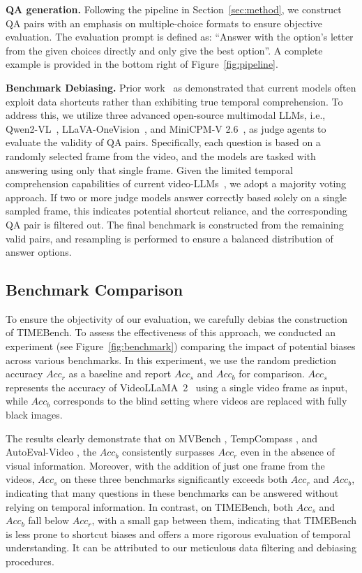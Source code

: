 \noindent\textbf{QA generation.} Following the pipeline in Section~\ref{sec:method}, we construct QA pairs with an emphasis on multiple-choice formats to ensure objective evaluation. The evaluation prompt is defined as: ``Answer with the option's letter from the given choices directly and only give the best option''. A complete example is provided in the bottom right of Figure~\ref{fig:pipeline}. 

\noindent\textbf{Benchmark Debiasing.} Prior work~\cite{Tong2024Eyes} as demonstrated that current models often exploit data shortcuts rather than exhibiting true temporal comprehension. To address this, we utilize three advanced open-source multimodal LLMs, i.e., Qwen2-VL~\cite{Wang2024Qwen2-VL}, LLaVA-OneVision~\cite{Li2025LLaVA-OneVision}, and MiniCPM-V 2.6~\cite{Yao2024MiniCPM-V}, as judge agents to evaluate the validity of QA pairs. 
Specifically, each question is based on a randomly selected frame from the video, and the models are tasked with answering using only that single frame. Given the limited temporal comprehension capabilities of current video-LLMs~\cite{Wang2024VideoHallucer,Li2024MVBench}, we adopt a majority voting approach. If two or more judge models answer correctly based solely on a single sampled frame, this indicates potential shortcut reliance, and the corresponding QA pair is filtered out. The final benchmark is constructed from the remaining valid pairs, and resampling is performed to ensure a balanced distribution of answer options.


\subsection{Benchmark Comparison}

To ensure the objectivity of our evaluation, we carefully debias the construction of TIMEBench. To assess the effectiveness of this approach,
we conducted an experiment (see Figure~\ref{fig:benchmark}) comparing the impact of potential biases across various benchmarks. In this experiment, we use the random prediction accuracy $Acc_r$ as a baseline and report $Acc_s$ and $Acc_b$ for comparison. $Acc_s$ represents the accuracy of VideoLLaMA~2~\cite{Cheng2024VideoLLaMA} using a single video frame as input, while $Acc_b$ corresponds to the blind setting where videos are replaced with fully black images.

The results clearly demonstrate that on MVBench \cite{Li2024MVBench}, TempCompass \cite{Liu2024TempCompass}, and AutoEval-Video \cite{Chen2023AutoEval}, the $Acc_b$ consistently surpasses $Acc_r$ even in the absence of visual information. Moreover, with the addition of just one frame from the videos, $Acc_s$ on these three benchmarks significantly exceeds both $Acc_r$ and $Acc_b$, indicating that many questions in these benchmarks can be answered without relying on temporal information. In contrast, on TIMEBench, both $Acc_s$ and $Acc_b$ fall below $Acc_r$, with a small gap between them, indicating that TIMEBench is less prone to shortcut biases and offers a more rigorous evaluation of temporal understanding. It can be attributed to our meticulous data filtering and debiasing procedures.

